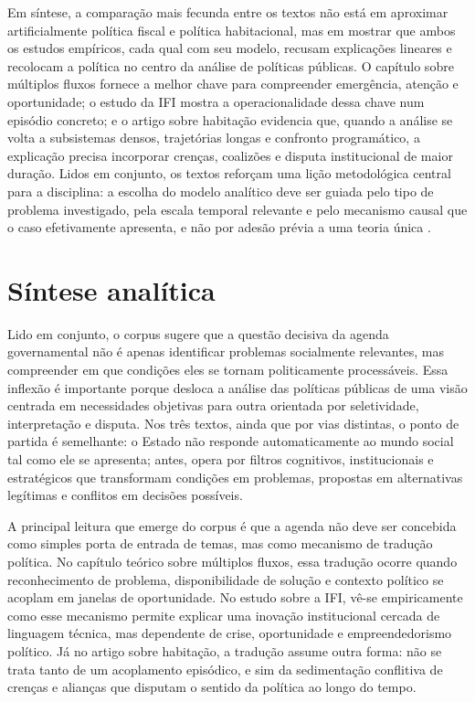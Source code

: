\documentclass[12pt,a4paper]{article}
\begin{document}
Em síntese, a comparação mais fecunda entre os textos não está em aproximar artificialmente política fiscal e política habitacional, mas em mostrar que ambos os estudos empíricos, cada qual com seu modelo, recusam explicações lineares e recolocam a política no centro da análise de políticas públicas. O capítulo sobre múltiplos fluxos fornece a melhor chave para compreender emergência, atenção e oportunidade; o estudo da IFI mostra a operacionalidade dessa chave num episódio concreto; e o artigo sobre habitação evidencia que, quando a análise se volta a subsistemas densos, trajetórias longas e confronto programático, a explicação precisa incorporar crenças, coalizões e disputa institucional de maior duração. Lidos em conjunto, os textos reforçam uma lição metodológica central para a disciplina: a escolha do modelo analítico deve ser guiada pelo tipo de problema investigado, pela escala temporal relevante e pelo mecanismo causal que o caso efetivamente apresenta, e não por adesão prévia a uma teoria única \parencite{brasil2022_abordagens_contemporaneas,anonsd_sem_titulo,ferreira2019_politica_habitacional}.



\section{Síntese analítica}
\label{sec:org2d0de30}

Lido em conjunto, o corpus sugere que a questão decisiva da agenda governamental não é apenas identificar problemas socialmente relevantes, mas compreender em que condições eles se tornam politicamente processáveis. Essa inflexão é importante porque desloca a análise das políticas públicas de uma visão centrada em necessidades objetivas para outra orientada por seletividade, interpretação e disputa. Nos três textos, ainda que por vias distintas, o ponto de partida é semelhante: o Estado não responde automaticamente ao mundo social tal como ele se apresenta; antes, opera por filtros cognitivos, institucionais e estratégicos que transformam condições em problemas, propostas em alternativas legítimas e conflitos em decisões possíveis.\parencite{brasil2022_abordagens_contemporaneas,anonsd_sem_titulo,ferreira2019_politica_habitacional}

A principal leitura que emerge do corpus é que a agenda não deve ser concebida como simples porta de entrada de temas, mas como mecanismo de tradução política. No capítulo teórico sobre múltiplos fluxos, essa tradução ocorre quando reconhecimento de problema, disponibilidade de solução e contexto político se acoplam em janelas de oportunidade. No estudo sobre a IFI, vê-se empiricamente como esse mecanismo permite explicar uma inovação institucional cercada de linguagem técnica, mas dependente de crise, oportunidade e empreendedorismo político. Já no artigo sobre habitação, a tradução assume outra forma: não se trata tanto de um acoplamento episódico, e sim da sedimentação conflitiva de crenças e alianças que disputam o sentido da política ao longo do tempo.\parencite{brasil2022_abordagens_contemporaneas,anonsd_sem_titulo,ferreira2019_politica_habitacional}
\end{document}
